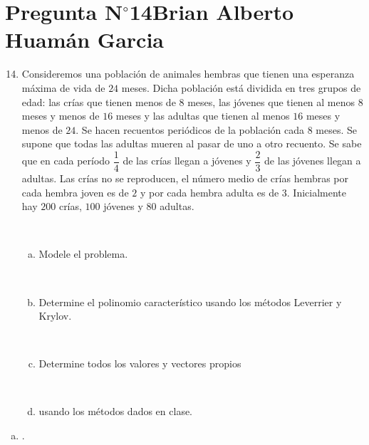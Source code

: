 \section{Pregunta N$^{\circ}$14\qquad Brian Alberto Huamán Garcia}

\begin{frame}
	\begin{enumerate}\setcounter{enumi}{13}
		\item

		      Consideremos una población de animales hembras que tienen
		      una esperanza máxima de vida de $24$ meses.
		      Dicha población está dividida en tres grupos de edad: las
		      crías que tienen menos de $8$ meses, las jóvenes que tienen
		      al menos $8$ meses y menos de $16$ meses y las adultas que
		      tienen al menos $16$ meses y menos de $24$.
		      Se hacen recuentos periódicos de la población cada $8$ meses.
		      Se supone que todas las adultas mueren al pasar de uno a
		      otro recuento.
		      Se sabe que en cada período $\dfrac{1}{4}$ de las crías
		      llegan a jóvenes y $\dfrac{2}{3}$ de las jóvenes llegan a adultas.
		      Las crías no se reproducen, el número medio de crías
		      hembras por cada hembra joven es de $2$ y por cada hembra
		      adulta es de $3$.
		      Inicialmente hay $200$ crías, $100$ jóvenes y $80$ adultas.

		      \

		      \begin{enumerate}[a)]
			      \item

			            Modele el problema.

			            \

			      \item


			            Determine el polinomio característico usando los
			            métodos Leverrier y Krylov.

			            \

			      \item

			            Determine todos los valores y vectores propios

			            \

			      \item


			            usando los métodos dados en clase.
		      \end{enumerate}
	\end{enumerate}

	\begin{solution}
		\begin{enumerate}[a)]
			\item

			      .
		\end{enumerate}
	\end{solution}
\end{frame}